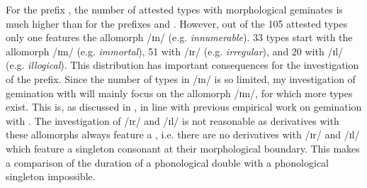 For the prefix , the number of attested types with morphological geminates is much higher than for the prefixes  and . However, out of the 105 attested types only one features the allomorph /ɪn/ (e.g. \textit{innumerable}). 33 types start with the allomorph /ɪm/ (e.g. \textit{immortal}), 51 with /ɪr/ (e.g. \textit{irregular}), and 20 with /ɪl/ (e.g. \textit{illogical}). 
This distribution has important consequences for the investigation of the prefix. Since the number of types in /ɪn/ is so limited, my investigation of gemination with  will mainly focus on the allomorph /ɪm/, for which more types exist. This is, as discussed in , in line with previous empirical work on gemination with .
The investigation of /ɪr/  and /ɪl/ is not reasonable as derivatives with these allomorphs always feature a , i.e. there are no derivatives with /ɪr/  and /ɪl/ which feature a singleton consonant at their morphological boundary. This makes a comparison of the duration of a phonological double with a phonological singleton impossible.
